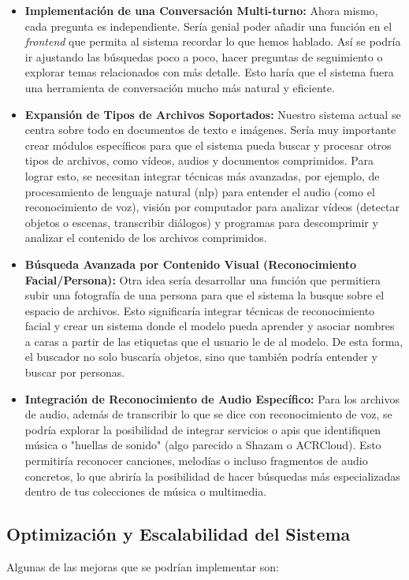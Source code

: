 \begin{itemize}
    \item \textbf{Implementación de una Conversación Multi-turno:} Ahora mismo, cada pregunta es independiente. Sería genial poder añadir una función en el \textit{frontend} que permita al sistema recordar lo que hemos hablado. Así se podría ir ajustando las búsquedas poco a poco, hacer preguntas de seguimiento o explorar temas relacionados con más detalle. Esto haría que el sistema fuera una herramienta de conversación mucho más natural y eficiente.
    \item \textbf{Expansión de Tipos de Archivos Soportados:} Nuestro sistema actual se centra sobre todo en documentos de texto e imágenes. Sería muy importante crear módulos específicos para que el sistema pueda buscar y procesar otros tipos de archivos, como vídeos, audios y documentos comprimidos. Para lograr esto, se necesitan integrar técnicas más avanzadas, por ejemplo, de procesamiento de lenguaje natural (\gls{nlp}) para entender el audio (como el reconocimiento de voz), visión por computador para analizar vídeos (detectar objetos o escenas, transcribir diálogos) y programas para descomprimir y analizar el contenido de los archivos comprimidos.
    \item \textbf{Búsqueda Avanzada por Contenido Visual (Reconocimiento Facial/Persona):} Otra idea sería desarrollar una función que permitiera subir una fotografía de una persona para que el sistema la busque sobre el espacio de archivos. Esto significaría integrar técnicas de reconocimiento facial y crear un sistema donde el modelo pueda aprender y asociar nombres a caras a partir de las etiquetas que el usuario le de al modelo. De esta forma, el buscador no solo buscaría objetos, sino que también podría entender y buscar por personas.
    \item \textbf{Integración de Reconocimiento de Audio Específico:} Para los archivos de audio, además de transcribir lo que se dice con reconocimiento de voz, se podría explorar la posibilidad de integrar servicios o \gls{api}s que identifiquen música o "huellas de sonido" (algo parecido a Shazam o ACRCloud). Esto permitiría reconocer canciones, melodías o incluso fragmentos de audio concretos, lo que abriría la posibilidad de hacer búsquedas más especializadas dentro de tus colecciones de música o multimedia.
\end{itemize}

\subsection{Optimización y Escalabilidad del Sistema}
Algunas de las mejoras que se podrían implementar son:


